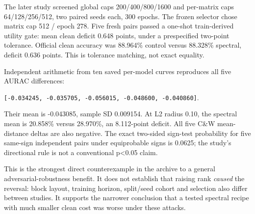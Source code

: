 \documentclass[
  british,
  10pt,
  a4paper,
]{article}
\begin{document}
The later study screened global caps
200/\allowbreak{}400/\allowbreak{}800/\allowbreak{}1600 and per-matrix
caps 64/\allowbreak{}128/\allowbreak{}256/\allowbreak{}512,\allowbreak{}
two paired seeds each, 300 epochs. The frozen selector chose matrix cap
512 / epoch 278. Five fresh pairs passed a one-shot
train-\allowbreak{}derived utility gate: mean clean deficit 0.648
points, under a prespecified two-point tolerance. Official clean
accuracy was 88.964\% control versus 88.328\% spectral, deficit 0.636
points. This is tolerance matching, not exact equality.

Independent arithmetic from ten saved per-model curves reproduces all
five AURAC differences:

\texttt{[-\allowbreak{}0.\allowbreak{}034245,\allowbreak{} \allowbreak{}-\allowbreak{}0.\allowbreak{}035705,\allowbreak{} \allowbreak{}-\allowbreak{}0.\allowbreak{}056015,\allowbreak{} \allowbreak{}-\allowbreak{}0.\allowbreak{}048600,\allowbreak{} \allowbreak{}-\allowbreak{}0.\allowbreak{}040860]}.

Their mean is -0.043085, sample SD 0.009154. At L2 radius 0.10, the
spectral mean is 20.858\% versus 28.970\%, an
8.\allowbreak{}112-\allowbreak{}point deficit. All five C\&W
mean-\allowbreak{}distance deltas are also negative. The exact two-sided
sign-test probability for five same-sign independent pairs under
equiprobable signs is 0.0625; the study's directional rule is not a
conventional p\textless0.05 claim.

This is the strongest direct counterexample in the archive to a general
adversarial-\allowbreak{}robustness benefit. It does not establish that
raising rank \emph{caused} the reversal: block layout, training horizon,
split/seed cohort and selection also differ between studies. It supports
the narrower conclusion that a tested spectral recipe with much smaller
clean cost was worse under these attacks.
\end{document}
